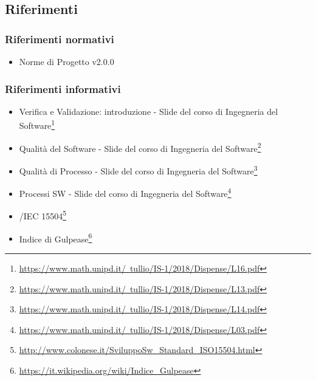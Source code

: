 \subsection{Riferimenti}
\label{sec:ref}
\subsubsection{Riferimenti normativi}
\begin{itemize}
	\item Norme di Progetto v2.0.0
\end{itemize}
\subsubsection{Riferimenti informativi}
\begin{itemize}
	\item
		Verifica e Validazione: introduzione - Slide del corso di Ingegneria del Software\footnote{\href{https://www.math.unipd.it/~tullio/IS-1/2018/Dispense/L16.pdf}{https://www.math.unipd.it/~tullio/IS-1/2018/Dispense/L16.pdf}}
	\item
		Qualità del Software - Slide del corso di Ingegneria del Software\footnote{\href{https://www.math.unipd.it/~tullio/IS-1/2018/Dispense/L13.pdf}{https://www.math.unipd.it/~tullio/IS-1/2018/Dispense/L13.pdf}}	
	\item
		Qualità di Processo - Slide del corso di Ingegneria del Software\footnote{\href{https://www.math.unipd.it/~tullio/IS-1/2018/Dispense/L14.pdf}{https://www.math.unipd.it/~tullio/IS-1/2018/Dispense/L14.pdf}}
	\item
		Processi SW - Slide del corso di Ingegneria del Software\footnote{\href{https://www.math.unipd.it/~tullio/IS-1/2018/Dispense/L03.pdf}{https://www.math.unipd.it/~tullio/IS-1/2018/Dispense/L03.pdf}}
	\item 
		/IEC 15504\footnote{\href{http://www.colonese.it/SviluppoSw_Standard_ISO15504.html}{http://www.colonese.it/SviluppoSw\_{}Standard\_{}ISO15504.html}}
	\item 
		Indice di Gulpease\footnote{\href{https://it.wikipedia.org/wiki/Indice_Gulpease}{https://it.wikipedia.org/wiki/Indice\_{}Gulpease}}
\end{itemize}
